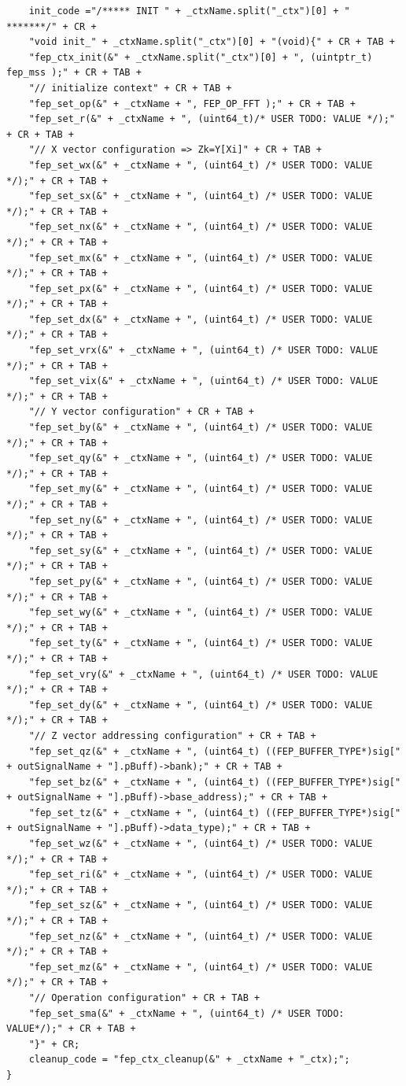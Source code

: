\documentclass{llncs}
\begin{document}
\begin{lstlisting}
	init_code ="/***** INIT " + _ctxName.split("_ctx")[0] + " *******/" + CR +
	"void init_" + _ctxName.split("_ctx")[0] + "(void){" + CR + TAB +
	"fep_ctx_init(&" + _ctxName.split("_ctx")[0] + ", (uintptr_t) fep_mss );" + CR + TAB +
	"// initialize context" + CR + TAB +
	"fep_set_op(&" + _ctxName + ", FEP_OP_FFT );" + CR + TAB +
	"fep_set_r(&" + _ctxName + ", (uint64_t)/* USER TODO: VALUE */);" + CR + TAB +
	"// X vector configuration => Zk=Y[Xi]" + CR + TAB +
	"fep_set_wx(&" + _ctxName + ", (uint64_t) /* USER TODO: VALUE */);" + CR + TAB +
	"fep_set_sx(&" + _ctxName + ", (uint64_t) /* USER TODO: VALUE */);" + CR + TAB +
	"fep_set_nx(&" + _ctxName + ", (uint64_t) /* USER TODO: VALUE */);" + CR + TAB +
	"fep_set_mx(&" + _ctxName + ", (uint64_t) /* USER TODO: VALUE */);" + CR + TAB +
	"fep_set_px(&" + _ctxName + ", (uint64_t) /* USER TODO: VALUE */);" + CR + TAB +
	"fep_set_dx(&" + _ctxName + ", (uint64_t) /* USER TODO: VALUE */);" + CR + TAB +
	"fep_set_vrx(&" + _ctxName + ", (uint64_t) /* USER TODO: VALUE */);" + CR + TAB +
	"fep_set_vix(&" + _ctxName + ", (uint64_t) /* USER TODO: VALUE */);" + CR + TAB +
	"// Y vector configuration" + CR + TAB +
	"fep_set_by(&" + _ctxName + ", (uint64_t) /* USER TODO: VALUE */);" + CR + TAB +
	"fep_set_qy(&" + _ctxName + ", (uint64_t) /* USER TODO: VALUE */);" + CR + TAB +
	"fep_set_my(&" + _ctxName + ", (uint64_t) /* USER TODO: VALUE */);" + CR + TAB +
	"fep_set_ny(&" + _ctxName + ", (uint64_t) /* USER TODO: VALUE */);" + CR + TAB +
	"fep_set_sy(&" + _ctxName + ", (uint64_t) /* USER TODO: VALUE */);" + CR + TAB +
	"fep_set_py(&" + _ctxName + ", (uint64_t) /* USER TODO: VALUE */);" + CR + TAB +
	"fep_set_wy(&" + _ctxName + ", (uint64_t) /* USER TODO: VALUE */);" + CR + TAB +
	"fep_set_ty(&" + _ctxName + ", (uint64_t) /* USER TODO: VALUE */);" + CR + TAB +
	"fep_set_vry(&" + _ctxName + ", (uint64_t) /* USER TODO: VALUE */);" + CR + TAB +
	"fep_set_dy(&" + _ctxName + ", (uint64_t) /* USER TODO: VALUE */);" + CR + TAB +
	"// Z vector addressing configuration" + CR + TAB +
	"fep_set_qz(&" + _ctxName + ", (uint64_t) ((FEP_BUFFER_TYPE*)sig[" + outSignalName + "].pBuff)->bank);" + CR + TAB +
	"fep_set_bz(&" + _ctxName + ", (uint64_t) ((FEP_BUFFER_TYPE*)sig[" + outSignalName + "].pBuff)->base_address);" + CR + TAB +
	"fep_set_tz(&" + _ctxName + ", (uint64_t) ((FEP_BUFFER_TYPE*)sig[" + outSignalName + "].pBuff)->data_type);" + CR + TAB +
	"fep_set_wz(&" + _ctxName + ", (uint64_t) /* USER TODO: VALUE */);" + CR + TAB +
	"fep_set_ri(&" + _ctxName + ", (uint64_t) /* USER TODO: VALUE */);" + CR + TAB +
	"fep_set_sz(&" + _ctxName + ", (uint64_t) /* USER TODO: VALUE */);" + CR + TAB +
	"fep_set_nz(&" + _ctxName + ", (uint64_t) /* USER TODO: VALUE */);" + CR + TAB +
	"fep_set_mz(&" + _ctxName + ", (uint64_t) /* USER TODO: VALUE */);" + CR + TAB +
	"// Operation configuration" + CR + TAB +
	"fep_set_sma(&" + _ctxName + ", (uint64_t) /* USER TODO: VALUE*/);" + CR + TAB +
	"}" + CR;
	cleanup_code = "fep_ctx_cleanup(&" + _ctxName + "_ctx);";
}
\end{lstlisting}
%
%
%
\newpage
\end{document}
